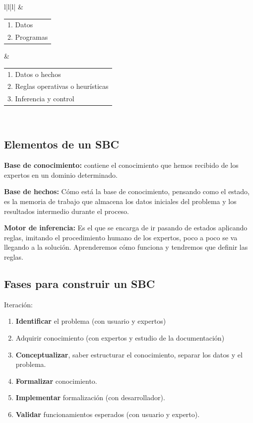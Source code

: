 \documentclass[12pt, twoside, openright]{report} %
\begin{document}
\begin{table}[H]
{\begin{tabular}{l|l|l|}
			 & \begin{tabular}[c]{@{}l@{}}1. Datos\\ 2. Programas\end{tabular}                            & \begin{tabular}[c]{@{}l@{}}1. Datos o hechos\\ 2. Reglas operativas o heurísticas\\ 3. Inferencia y control\end{tabular}                                \\ \hline
		\end{tabular}%
	}
\end{table}

\subsection{Elementos de un SBC}
\textbf{Base de conocimiento:} contiene el conocimiento que hemos recibido de los expertos en un dominio determinado.

\textbf{Base de hechos:} Cómo está la base de conocimiento, pensando como el estado, es la memoria de trabajo que almacena los datos iniciales del problema y los resultados intermedio durante el proceso.

\textbf{Motor de inferencia:} Es el que se encarga de ir pasando de estados aplicando reglas, imitando el procedimiento humano de los expertos, poco a poco se va llegando a la solución. Aprenderemos cómo funciona y tendremos que definir las reglas.
\begin{figure}[H]
	{\def\svgwidth{.8\textwidth}
		}
\end{figure}
\pagebreak

\subsection{Fases para construir un SBC}
Iteración:
\begin{enumerate}
	\item \textbf{Identificar} el problema (con usuario y expertos)
	\item Adquirir conocimiento (con expertos y estudio de la documentación)
	\item \textbf{Conceptualizar}, saber estructurar el conocimiento, separar los datos y el problema.
	\item \textbf{Formalizar} conocimiento.
	\item \textbf{Implementar} formalización (con desarrollador).
	\item \textbf{Validar} funcionamientos esperados (con usuario y experto).
\end{enumerate}
\end{document}
